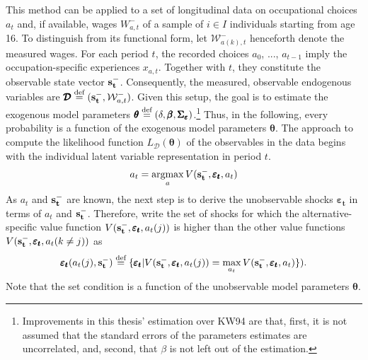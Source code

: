 This method can be applied to a set of longitudinal data on occupational choices $a_t$ and, if available, wages $W_{a,t}^{-}$ of a sample of $i \in I$ individuals starting from age 16. To distinguish from its functional form, let $\mathcal{W}^{-}_{a(k),t}$ henceforth denote the measured wages. For each period $t$, the recorded choices $a_0$, ..., $a_{t-1}$  imply the occupation-specific experiences $x_{a,t}$. Together with $t$, they constitute the observable state vector $\bold{s_t^-}$. Consequently, the measured, observable endogenous variables are $\pmb{\mathcal{D}}\stackrel{\text{def}}{=}(\bold{s_t^-},\mathcal{W}^{-}_{a,t})$. Given this setup, the goal is to estimate the exogenous model parameters $\pmb{\theta}\stackrel{\text{def}}{=}(\delta, \pmb{\beta}, \pmb{\Sigma_\varepsilon})$.\footnote{Improvements in this thesis' estimation over KW94 are that, first, it is not assumed that the standard errors of the parameters estimates are uncorrelated, and, second, that $\beta$ is not left out of the estimation.} Thus, in the following, every probability is a function of the exogenous model parameters $\pmb{\theta}$.
The approach to compute the likelihood function $L_{\pmb{\mathcal{D}}}(\pmb{\theta})$ of the observables in the data begins with the individual latent variable representation in period $t$.
\begin{align}
a_t = \operatorname*{argmax}_a V(\bold{s_t^-},\pmb{\varepsilon_t},a_t)
\end{align}
As $a_t$ and $\bold{s_t^-}$ are known, the next step is to derive the unobservable shocks $\pmb{\varepsilon_t}$ in terms of $a_t$ and $\bold{s_t^-}$. Therefore, write the set of shocks for which the alternative-specific value function $V(\bold{s_t^-},\pmb{\varepsilon_t},a_t(j))$ is higher than the other value functions $V(\bold{s_t^-},\pmb{\varepsilon_t},a_t(k\neq j))$ as
\begin{align}
\pmb{\varepsilon_t}(a_t(j),\bold{s_t^-}) \stackrel{\text{def}}{=} \{\pmb{\varepsilon_t}|V(\bold{s_t^-},\pmb{\varepsilon_t},a_t(j)) = \max_{a_t} V(\bold{s_t^-},\pmb{\varepsilon_t},a_t)\}).
\end{align}
Note that the set condition is a function of the unobservable model parameters $\pmb{\theta}$.

